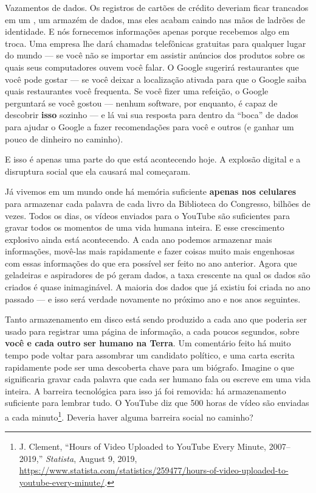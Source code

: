 Vazamentos de dados. Os registros de cartões de crédito deveriam ficar trancados
em um , um armazém de dados, mas eles acabam caindo nas
mãos de ladrões de identidade. E nós fornecemos informações apenas porque
recebemos algo em troca. Uma empresa lhe dará chamadas telefônicas gratuitas
para qualquer lugar do mundo --- se você não se importar em assistir anúncios
dos produtos sobre os quais seus computadores ouvem você falar. O Google
sugerirá restaurantes que você pode gostar --- se você deixar a localização
ativada para que o Google saiba quais restaurantes você frequenta. Se você fizer
uma refeição, o Google perguntará se você gostou --- nenhum software, por
enquanto, é capaz de descobrir \textbf{isso} sozinho --- e lá vai sua resposta
para dentro da ``boca'' de dados para ajudar o Google a fazer recomendações para
você e outros (e ganhar um pouco de dinheiro no caminho).

E isso é apenas uma parte do que está acontecendo hoje. A explosão digital e a
disruptura social que ela causará mal começaram.

Já vivemos em um mundo onde há memória suficiente \textbf{apenas nos celulares}
para armazenar cada palavra de cada livro da Biblioteca do Congresso, bilhões de
vezes. Todos os dias, os vídeos enviados para
o YouTube são suficientes para
gravar todos os momentos de uma vida humana inteira. E esse crescimento
explosivo ainda está acontecendo. A cada ano podemos armazenar mais informações,
movê-las mais rapidamente e fazer coisas muito mais engenhosas com essas
informações do que era possível ser feito no ano anterior. Agora que geladeiras
e aspiradores de pó geram dados, a taxa crescente na qual os dados são criados é
quase inimaginável. A maioria dos dados que já existiu foi criada no ano passado
--- e isso será verdade novamente no próximo ano e nos anos seguintes.

Tanto armazenamento em disco 
está sendo produzido a cada ano que poderia ser 
usado para registrar uma página de informação, a cada poucos segundos, sobre 
\textbf{você e cada outro ser humano na Terra}. Um comentário feito há muito 
tempo pode voltar para assombrar um candidato político, e uma carta escrita 
rapidamente pode ser uma descoberta chave para um biógrafo. Imagine o que 
significaria gravar cada palavra que cada ser humano fala ou escreve em uma 
vida inteira. A barreira tecnológica para isso já foi removida: há armazenamento
suficiente para lembrar tudo. O YouTube diz que 500 horas de vídeo são enviadas 
a cada minuto\footnote{J. Clement, ``Hours of Video Uploaded to YouTube Every
Minute, 2007–2019,'' \textit{Statista}, August 9, 2019,
\url{https://www.statista.com/statistics/259477/hours-of-video-uploaded-to-youtube-every-minute/}.}. Deveria
haver alguma barreira social no caminho?

